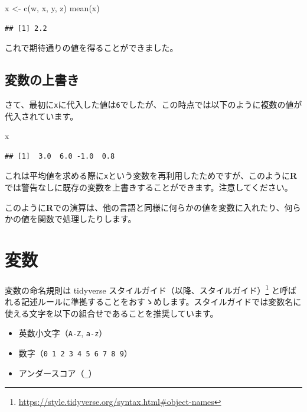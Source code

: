 \documentclass[
  12pt,
]{book}
\newenvironment{Shaded}{\begin{snugshade}}{\end{snugshade}}
\newcommand{\FunctionTok}[1]{\textcolor[rgb]{0.00,0.00,0.00}{#1}}
\newcommand{\NormalTok}[1]{#1}
\newcommand{\OtherTok}[1]{\textcolor[rgb]{0.56,0.35,0.01}{#1}}
\DeclareRobustCommand{\href}[2]{#2\footnote{\url{#1}}}
\providecommand{\tightlist}{%
  \setlength{\itemsep}{0pt}\setlength{\parskip}{0pt}}
\begin{document}
\begin{Shaded}
\begin{Highlighting}[numbers=left,,]
\NormalTok{x }\OtherTok{\textless{}{-}} \FunctionTok{c}\NormalTok{(w, x, y, z)}
\FunctionTok{mean}\NormalTok{(x)}
\end{Highlighting}
\end{Shaded}

\begin{verbatim}
## [1] 2.2
\end{verbatim}

これで期待通りの値を得ることができました。

\hypertarget{ux5909ux6570ux306eux4e0aux66f8ux304d}{%
\subsection{変数の上書き}\label{ux5909ux6570ux306eux4e0aux66f8ux304d}}

さて、最初に\texttt{x}に代入した値は\texttt{6}でしたが、この時点では以下のように複数の値が代入されています。

\begin{Shaded}
\begin{Highlighting}[numbers=left,,]
\NormalTok{x}
\end{Highlighting}
\end{Shaded}

\begin{verbatim}
## [1]  3.0  6.0 -1.0  0.8
\end{verbatim}

これは平均値を求める際に\texttt{x}という変数を再利用したためですが、このように\textbf{R}では警告なしに既存の変数を上書きすることができます。注意してください。

このように\textbf{R}での演算は、他の言語と同様に何らかの値を変数に入れたり、何らかの値を関数で処理したりします。

\hypertarget{ux5909ux6570}{%
\section{変数}\label{ux5909ux6570}}

変数の命名規則は \href{https://style.tidyverse.org/syntax.html\#object-names}{tidyverse スタイルガイド（以降、スタイルガイド）} と呼ばれる記述ルールに準拠することをおすゝめします。スタイルガイドでは変数名に使える文字を以下の組合せであることを推奨しています。

\begin{itemize}
\tightlist
\item
  英数小文字（\texttt{A-Z}, \texttt{a-z}）
\item
  数字（\texttt{0\ 1\ 2\ 3\ 4\ 5\ 6\ 7\ 8\ 9}）
\item
  アンダースコア（\texttt{\_}）
\end{itemize}
\end{document}
